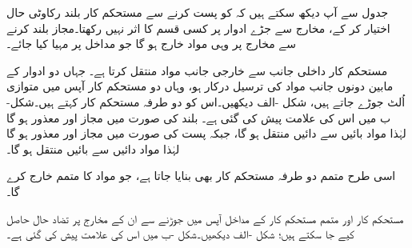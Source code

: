 جدول سے آپ دیکھ سکتے ہیں کہ  کو پست   کرنے  سے  مستحکم کار  بلند رکاوٹی حال  اختیار کر  کے،    مخارج سے   جڑے ادوار پر کسی  قسم کا  اثر نہیں رکھتا۔مجاز بلند   کرنے سے مخارج پر وہی مواد خارج  ہو گا  جو  مداخل پر مہیا کیا جائے۔


مستحکم کار  داخلی جانب سے خارجی جانب مواد  منتقل  کرتا ہے۔  جہاں دو ادوار کے مابین دونوں جانب مواد کی  ترسیل درکار ہو،  وہاں دو مستحکم کار آپس میں متوازی  اُلٹ  جوڑے  جاتے  ہیں،  شکل  -الف دیکھیں۔اس کو  دو طرفہ مستحکم کار کہتے ہیں۔شکل-ب میں اس کی علامت  پیش کی  گئی ہے۔  بلند    کی صورت میں  مجاز  اور   معذور ہو گا لہٰذا  مواد بائیں سے دائیں منتقل ہو گا، جبکہ پست  کی   صورت میں  مجاز اور  معذور ہو گا لہٰذا مواد   دائیں سے بائیں منتقل ہو گا۔

اسی طرح   متمم  دو طرفہ مستحکم کار بھی بنایا جاتا ہے، جو مواد کا متمم خارج کرے گا۔

  مستحکم کار اور   متمم مستحکم کار کے  مداخل آپس میں  جوڑنے سے ان کے مخارج پر تضاد حال حاصل کیے جا سکتے ہیں؛  شکل  -الف  دیکھیں۔شکل -ب میں اس کی علامت پیش کی گئی ہے۔
 
